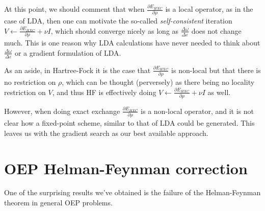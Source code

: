 \documentclass{article}
\newcommand{\Vscp}{V}
\begin{document}
At this point, we should comment that when
$\frac{\partial E_{HXC}}{\partial \rho}$ is a local operator, as in the
case of LDA, then one can motivate the so-called {\em self-consistent}
iteration $\Vscp \leftarrow \frac{\partial E_{HXC}}{\partial \rho} + \nu I$,
which should converge nicely as long as 
$\frac{\Delta \omega}{\Delta \varepsilon}$ does not change much.
This is one reason why LDA calculations have never needed 
to think about $\frac{\Delta \omega}{\Delta \varepsilon}$ or a gradient
formulation of LDA.

As an aside, in Hartree-Fock it is the case
that $\frac{\partial E_{HXC}}{\partial \rho}$ is non-local but that
there is no restriction on $\rho$, which can be thought (perversely)
as there being no locality restriction on $\Vscp$, and thus HF is effectively
doing $\Vscp \leftarrow \frac{\partial E_{HXC}}{\partial \rho} + \nu I$
as well.

However, when doing exact exchange
$\frac{\partial E_{HXC}}{\partial \rho}$ is a non-local operator, and
it is not clear how a fixed-point scheme, similar to that of LDA could
be generated.  This leaves us with the gradient search as our best
available approach.

\section{OEP Helman-Feynman correction}

One of the surprising results we've obtained is the failure of the
Helman-Feynman theorem in general OEP problems.
\end{document}
